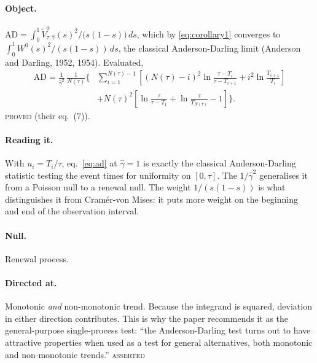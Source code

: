 \documentclass[11pt,a4paper]{article}
\newcommand{\Vtilde}{\widetilde{V}^{0}_{\tau,\hat\gamma}}
\newcommand{\Wbridge}{W^{0}}
\newcommand{\gh}{\hat\gamma}
\newcommand{\Ntau}{N(\tau)}
\newcommand{\PROVED}{\textsc{\textcolor{blue!55!black}{proved}}}
\newcommand{\ASSERTED}{\textsc{\textcolor{purple!70!black}{asserted}}}
\begin{document}
\paragraph{Object.}
$\mathrm{AD} = \int_0^1 \Vtilde(s)^2/\bigl(s(1-s)\bigr)\,ds$, which by
\eqref{eq:corollary1} converges to $\int_0^1 \Wbridge(s)^2/(s(1-s))\,ds$, the classical
Anderson-Darling limit (Anderson and Darling, 1952, 1954). Evaluated,
%
\begin{equation}
\begin{split}
\mathrm{AD} = \frac{1}{\gh^{2}}\,\frac{1}{\Ntau}
\Biggl\{&\sum_{i=1}^{\Ntau-1}\left[(\Ntau-i)^2\ln\frac{\tau - T_i}{\tau - T_{i+1}}
+ i^2 \ln\frac{T_{i+1}}{T_i}\right]\\
&+ \Ntau^{2}\left[\ln\frac{\tau}{\tau - T_1} + \ln\frac{\tau}{T_{\Ntau}} - 1\right]\Biggr\}.
\end{split}
\label{eq:ad}
\end{equation}
\PROVED{} (their eq.~(7)).

\paragraph{Reading it.} With $u_i = T_i/\tau$, eq.~\eqref{eq:ad} at $\gh = 1$ is exactly
the classical Anderson-Darling statistic testing the event times for uniformity on
$[0,\tau]$. The $1/\gh^2$ generalises it from a Poisson null to a renewal null. The
weight $1/(s(1-s))$ is what distinguishes it from Cramér-von Mises: it puts more weight
on the beginning and end of the observation interval.

\paragraph{Null.} Renewal process.

\paragraph{Directed at.} Monotonic \emph{and} non-monotonic trend. Because the
integrand is squared, deviation in either direction contributes. This is why the paper
recommends it as the general-purpose single-process test: \enquote{the Anderson-Darling
test turns out to have attractive properties when used as a test for general
alternatives, both monotonic and non-monotonic trends.} \ASSERTED
\end{document}
